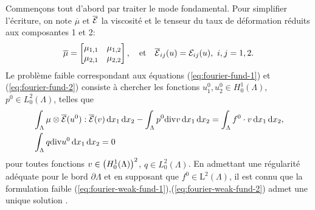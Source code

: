 Commençons tout d'abord par traiter le mode fondamental. Pour
simplifier l'écriture, on note $\overline{\mu}$ et
$\overline{\mathcal E}$ la viscosité et le tenseur du taux de
déformation réduits aux composantes 1 et 2:
\begin{equation}
 \overline{\mu} = \begin{bmatrix}
  \mu_{1,1} & \mu_{1,2} \\
  \mu_{2,1} & \mu_{2,2}
 \end{bmatrix},\quad \text{et} \quad \overline{\mathcal E}_{ij}(u) =
 \mathcal E_{ij}(u),\ i,j = 1,2.
\end{equation}
Le problème faible correspondant aux équations
(\ref{eq:fourier-fund-1}) et (\ref{eq:fourier-fund-2}) consiste à
chercher les fonctions $u_1^0,u_2^0 \in H^1_0(\Lambda)$, $p^0 \in
L^2_0(\Lambda)$, telles que
\begin{align}
  &\int_\Lambda \mu\otimes \overline{\mathcal E}(u^0) : \overline{\mathcal E}(v) \,\mathrm dx_1\,\mathrm dx_2 -
  \int_\Lambda p^0\mathrm{div} v \,\mathrm dx_1\,\mathrm dx_2 = \int_\Lambda f^0\cdot v
  \,\mathrm dx_1\,\mathrm dx_2,\label{eq:fourier-weak-fund-1}\\
  &\int_\Lambda q\mathrm{div} u^0 \,\mathrm dx_1\,\mathrm dx_2 = 0\label{eq:fourier-weak-fund-2}
\end{align}
pour toutes fonctions $v \in \left( H^1_0(\Lambda) \right)^2$, $q \in
L_0^2(\Lambda)$. En admettant une régularité adéquate pour le bord
$\partial \Lambda$ et en supposant que $f^0\in \mathrm L^2(\Lambda)$,
il est connu que la formulation faible
(\ref{eq:fourier-weak-fund-1}),(\ref{eq:fourier-weak-fund-2}) admet une unique
solution \cite{Temam1977}.

